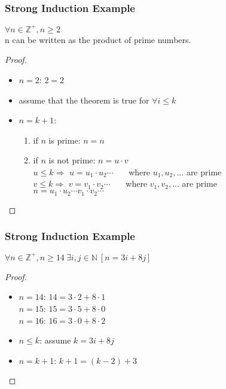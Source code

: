 \documentclass[dvipsnames]{beamer}
\begin{document}
\begin{frame}
  \frametitle{Strong Induction Example}

  \begin{theorem}
    $\forall n \in \mathbb{Z}^+, n \geq 2$\\
      n can be written as the product of prime numbers.
  \end{theorem}

  \pause
  \begin{proof}
    \begin{itemize}
      \item $n=2$: $2=2$

      \pause
      \item assume that the theorem is true for $\forall i \leq k$

      \pause
      \item $n=k+1$:
      \begin{enumerate}
        \item if $n$ is prime: $n=n$

        \pause
        \item if $n$ is not prime: $n = u \cdot v$\\
          $u \leq k \Rightarrow$ $u = u_1 \cdot u_2 \cdots$
            ~~~where $u_1, u_2, \ldots$ are prime\\
          $v \leq k \Rightarrow$ $v = v_1 \cdot v_2 \cdots$
            ~~~where $v_1, v_2, \ldots$ are prime\\
          $n = u_1 \cdot u_2 \cdots v_1 \cdot v_2 \cdots$
      \end{enumerate}
    \end{itemize}
  \end{proof}
\end{frame}

\begin{frame}
  \frametitle{Strong Induction Example}

  \begin{theorem}
    $\forall n \in \mathbb{Z}^+, n \geq 14~\exists i,j \in \mathbb{N}~[n=3i+8j]$
  \end{theorem}

  \pause
  \begin{proof}
    \begin{itemize}
      \item $n=14$: $14=3 \cdot 2 + 8 \cdot 1$\\
        $n=15$: $15=3 \cdot 5 + 8 \cdot 0$\\
        $n=16$: $16=3 \cdot 0 + 8 \cdot 2$

      \pause
      \item $n \leq k$: assume $k=3i+8j$

      \pause
      \item $n=k+1$: $k+1=(k-2)+3$
    \end{itemize}
  \end{proof}
\end{frame}
\end{document}
